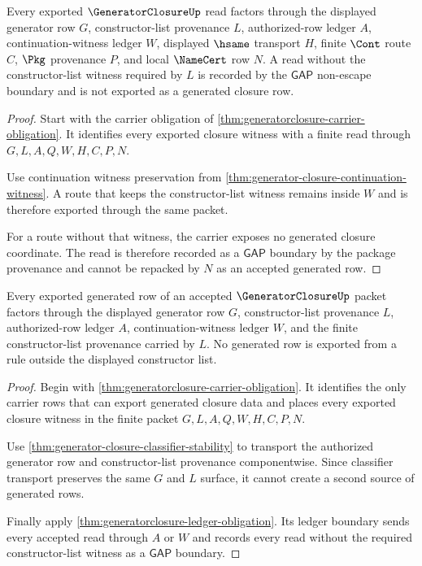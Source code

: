 \begin{theorem}
\label{thm:generatorclosure-ledger-obligation}
Every exported $\GeneratorClosureUp$ read factors through the displayed generator row $G$, constructor-list provenance $L$, authorized-row ledger $A$, continuation-witness ledger $W$, displayed $\hsame$ transport $H$, finite $\Cont$ route $C$, $\Pkg$ provenance $P$, and local $\NameCert$ row $N$. A read without the constructor-list witness required by $L$ is recorded by the $\mathsf{GAP}$ non-escape boundary and is not exported as a generated closure row.
\end{theorem}
\begin{proof}
Start with the carrier obligation of \autoref{thm:generatorclosure-carrier-obligation}. It identifies every exported closure witness with a finite read through $G,L,A,Q,W,H,C,P,N$.

Use continuation witness preservation from \autoref{thm:generator-closure-continuation-witness}. A route that keeps the constructor-list witness remains inside $W$ and is therefore exported through the same packet.

For a route without that witness, the carrier exposes no generated closure coordinate. The read is therefore recorded as a $\mathsf{GAP}$ boundary by the package provenance and cannot be repacked by $N$ as an accepted generated row.
\end{proof}

\begin{theorem}
\label{thm:generator-closure-authorized-row-exhaustion}
Every exported generated row of an accepted $\GeneratorClosureUp$ packet factors through the displayed generator row $G$, constructor-list provenance $L$, authorized-row ledger $A$, continuation-witness ledger $W$, and the finite constructor-list provenance carried by $L$. No generated row is exported from a rule outside the displayed constructor list.
\end{theorem}
\begin{proof}
Begin with \autoref{thm:generatorclosure-carrier-obligation}. It identifies the only carrier rows that can export generated closure data and places every exported closure witness in the finite packet $G,L,A,Q,W,H,C,P,N$.

Use \autoref{thm:generator-closure-classifier-stability} to transport the authorized generator row and constructor-list provenance componentwise. Since classifier transport preserves the same $G$ and $L$ surface, it cannot create a second source of generated rows.

Finally apply \autoref{thm:generatorclosure-ledger-obligation}. Its ledger boundary sends every accepted read through $A$ or $W$ and records every read without the required constructor-list witness as a $\mathsf{GAP}$ boundary.
\end{proof}

